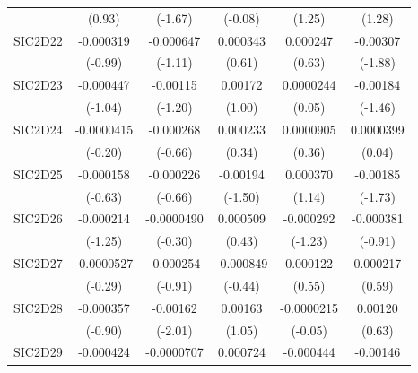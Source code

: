 \begin{table}[htbp]
\begin{tabular}{l*{5}{c}}
            &      (0.93)         &     (-1.67)         &     (-0.08)         &      (1.25)         &      (1.28)         \\
SIC2D22     &   -0.000319         &   -0.000647         &    0.000343         &    0.000247         &    -0.00307         \\
            &     (-0.99)         &     (-1.11)         &      (0.61)         &      (0.63)         &     (-1.88)         \\
SIC2D23     &   -0.000447         &    -0.00115         &     0.00172         &   0.0000244         &    -0.00184         \\
            &     (-1.04)         &     (-1.20)         &      (1.00)         &      (0.05)         &     (-1.46)         \\
SIC2D24     &  -0.0000415         &   -0.000268         &    0.000233         &   0.0000905         &   0.0000399         \\
            &     (-0.20)         &     (-0.66)         &      (0.34)         &      (0.36)         &      (0.04)         \\
SIC2D25     &   -0.000158         &   -0.000226         &    -0.00194         &    0.000370         &    -0.00185         \\
            &     (-0.63)         &     (-0.66)         &     (-1.50)         &      (1.14)         &     (-1.73)         \\
SIC2D26     &   -0.000214         &  -0.0000490         &    0.000509         &   -0.000292         &   -0.000381         \\
            &     (-1.25)         &     (-0.30)         &      (0.43)         &     (-1.23)         &     (-0.91)         \\
SIC2D27     &  -0.0000527         &   -0.000254         &   -0.000849         &    0.000122         &    0.000217         \\
            &     (-0.29)         &     (-0.91)         &     (-0.44)         &      (0.55)         &      (0.59)         \\
SIC2D28     &   -0.000357         &    -0.00162\sym{*}  &     0.00163         &  -0.0000215         &     0.00120         \\
            &     (-0.90)         &     (-2.01)         &      (1.05)         &     (-0.05)         &      (0.63)         \\
SIC2D29     &   -0.000424         &  -0.0000707         &    0.000724         &   -0.000444         &    -0.00146         \\

\end{tabular}
\end{table}
